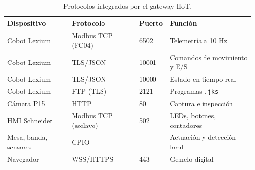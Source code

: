 \documentclass{styles/svproc}
\begin{document}
\begin{table}[t]
  \caption{Protocolos integrados por el gateway IIoT.}
  \label{tab:protocolos}
  \centering
  \scriptsize
  \begin{tabular}{@{}llll@{}}
    \toprule
    Dispositivo & Protocolo & Puerto & Función \\
    \midrule
    Cobot Lexium & Modbus TCP (FC04) & 6502 & Telemetría a 10 Hz \\
    Cobot Lexium & TLS/JSON & 10001 & Comandos de movimiento y E/S \\
    Cobot Lexium & TLS/JSON & 10000 & Estado en tiempo real \\
    Cobot Lexium & FTP (TLS) & 2121 & Programas \texttt{.jks} \\
    Cámara P15 & HTTP & 80 & Captura e inspección \\
    HMI Schneider & Modbus TCP (esclavo) & 502 & LEDs, botones, contadores \\
    Mesa, banda, sensores & GPIO & --- & Actuación y detección local \\
    Navegador & WSS/HTTPS & 443 & Gemelo digital \\
    \bottomrule
  \end{tabular}
\end{table}
\end{document}
